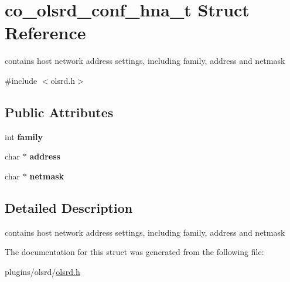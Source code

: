 \hypertarget{structco__olsrd__conf__hna__t}{\section{co\-\_\-olsrd\-\_\-conf\-\_\-hna\-\_\-t Struct Reference}
\label{structco__olsrd__conf__hna__t}
}


contains host network address settings, including family, address and netmask  




{\ttfamily \#include $<$olsrd.\-h$>$}

\subsection*{Public Attributes}
\begin{DoxyCompactItemize}
\item 
\hypertarget{structco__olsrd__conf__hna__t_a2e9a130f7a50b568bbb689f9bc41668a}{int {\bfseries family}}\label{structco__olsrd__conf__hna__t_a2e9a130f7a50b568bbb689f9bc41668a}

\item 
\hypertarget{structco__olsrd__conf__hna__t_a80332f47fb5a7d11067c8db985ceccbd}{char $\ast$ {\bfseries address}}\label{structco__olsrd__conf__hna__t_a80332f47fb5a7d11067c8db985ceccbd}

\item 
\hypertarget{structco__olsrd__conf__hna__t_a82b7e95401801c8d539e54183abbde3d}{char $\ast$ {\bfseries netmask}}\label{structco__olsrd__conf__hna__t_a82b7e95401801c8d539e54183abbde3d}

\end{DoxyCompactItemize}


\subsection{Detailed Description}
contains host network address settings, including family, address and netmask 

The documentation for this struct was generated from the following file\-:\begin{DoxyCompactItemize}
\item 
plugins/olsrd/\hyperlink{olsrd_8h}{olsrd.\-h}\end{DoxyCompactItemize}
